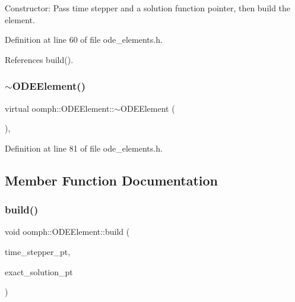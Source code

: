 Constructor\+: Pass time stepper and a solution function pointer, then build the element. 

Definition at line 60 of file ode\+\_\+elements.\+h.



References build().

\mbox{\label{classoomph_1_1ODEElement_acc30d7f02f15948f113cc4209ca9ca33}} 
\subsubsection{\texorpdfstring{$\sim$\+O\+D\+E\+Element()}{~ODEElement()}}
{\footnotesize\ttfamily virtual oomph\+::\+O\+D\+E\+Element\+::$\sim$\+O\+D\+E\+Element (\begin{DoxyParamCaption}{ }\end{DoxyParamCaption})\hspace{0.3cm}{\ttfamily [inline]}, {\ttfamily [virtual]}}



Definition at line 81 of file ode\+\_\+elements.\+h.



\subsection{Member Function Documentation}
\mbox{\label{classoomph_1_1ODEElement_ab7885b17adcc0d175a1522197d9d30cf}} 
\subsubsection{\texorpdfstring{build()}{build()}}
{\footnotesize\ttfamily void oomph\+::\+O\+D\+E\+Element\+::build (\begin{DoxyParamCaption}\item[{\hyperlink{classoomph_1_1TimeStepper}{Time\+Stepper} $\ast$}]{time\+\_\+stepper\+\_\+pt,  }\item[{\hyperlink{classoomph_1_1SolutionFunctorBase}{Solution\+Functor\+Base} $\ast$}]{exact\+\_\+solution\+\_\+pt }\end{DoxyParamCaption})\hspace{0.3cm}{\ttfamily [inline]}}



